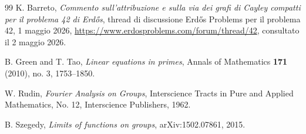 \documentclass[11pt]{article}
\numberwithin{equation}{section}
\newcommand{\1}{\mathbf 1}
\begin{document}
\begin{thebibliography}{99}
K. Barreto,
\emph{Commento sull'attribuzione e sulla via dei grafi di Cayley compatti per il problema 42 di Erd\H{o}s},
thread di discussione Erd\H{o}s Problems per il problema 42, 1 maggio 2026,
\url{https://www.erdosproblems.com/forum/thread/42},
consultato il 2 maggio 2026.

B. Green and T. Tao,
\emph{Linear equations in primes},
Annals of Mathematics \textbf{171} (2010), no. 3, 1753--1850.

W. Rudin,
\emph{Fourier Analysis on Groups},
Interscience Tracts in Pure and Applied Mathematics, No. 12,
Interscience Publishers, 1962.

B. Szegedy,
\emph{Limits of functions on groups},
arXiv:1502.07861, 2015.

\end{thebibliography}
\end{document}
